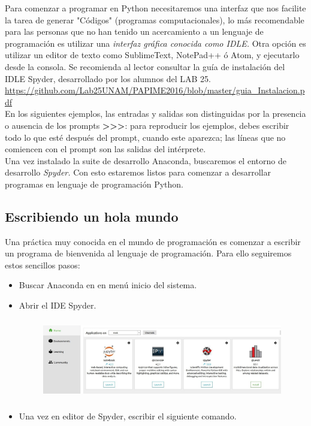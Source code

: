 \documentclass[a4paper, openright, 12pt]{article}
\begin{document}
    Para comenzar a programar en Python necesitaremos una interfaz que nos facilite la tarea de generar "Códigos" (programas computacionales), lo más recomendable para las personas que no han tenido un acercamiento a un lenguaje de programación es utilizar una \textit{interfaz gráfica conocida como IDLE.} Otra opción es utilizar un editor de texto como SublimeText, NotePad++ ó Atom, y ejecutarlo desde la consola. Se recomienda al lector consultar la guía de instalación del IDLE Spyder, desarrollado por los alumnos del LAB 25. \url{https://github.com/Lab25UNAM/PAPIME2016/blob/master/guia_Instalacion.pdf}\\

    En  los  siguientes  ejemplos,  las  entradas  y  salidas  son distinguidas  por  la  presencia  o  ausencia  de  los prompts \textbf{>>>}:  para  reproducir  los  ejemplos,  debes  escribir  todo  lo  que  esté  después  del prompt, cuando este aparezca; las líneas que no comiencen con el prompt son las salidas del intérprete.\\

    Una vez instalado la suite de desarrollo Anaconda, buscaremos el entorno de desarrollo \textit{Spyder.} Con esto estaremos listos para comenzar a desarrollar programas en lenguaje de programación Python.\\

    \subsection{Escribiendo un hola mundo}

    Una práctica muy conocida en el mundo de programación es comenzar a escribir un programa de bienvenida al lenguaje de programación. Para ello seguiremos estos sencillos pasos:

    \begin{itemize}
      \item{Buscar Anaconda en en menú inicio del sistema.}
      \item{Abrir el IDE Spyder.}
        \begin{figure}[ht]
            \centering
            \includegraphics[width=10.5cm, height=3.5cm]{w_11.jpg}
        \end{figure}
      \item{Una vez en editor de Spyder, escribir el siguiente comando.}
    \end{itemize}
\end{document}
